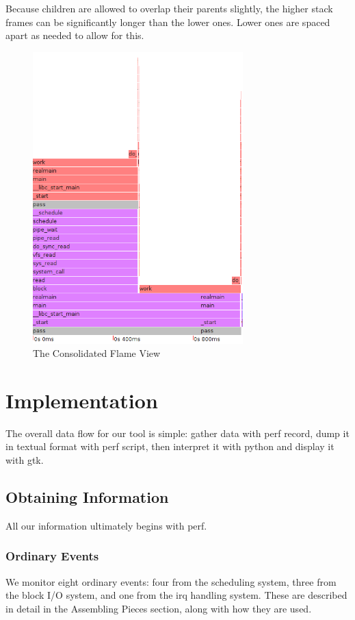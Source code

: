 \documentclass[10pt]{article}
\begin{document}
Because children are allowed to overlap their parents slightly, the higher stack frames can be significantly longer than the lower ones.  Lower ones are spaced apart as needed to allow for this.

\begin{figure}[h!]
\includegraphics[width=3.2in]{images/passcons}
\caption{The Consolidated Flame View}
\end{figure}

\section{Implementation}

The overall data flow for our tool is simple: gather data with perf record, dump it in textual format with perf script, then interpret it with python and display it with gtk.

\subsection{Obtaining Information}

All our information ultimately begins with perf.

\subsubsection{Ordinary Events}

We monitor eight ordinary events: four from the sched\-uling system, three from the block I/O system, and one from the irq handling system.  These are described in detail in the Assembling Pieces section, along with how they are used.
\end{document}
